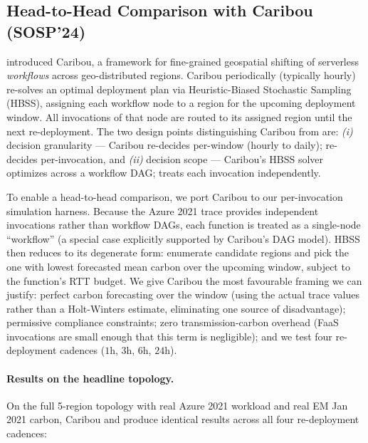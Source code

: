 \subsection{Head-to-Head Comparison with Caribou (SOSP'24)}
\label{sec:evaluation:caribou}

\citet{gsteiger2024caribou} introduced Caribou, a framework for
fine-grained geospatial shifting of serverless \emph{workflows}
across geo-distributed regions. Caribou periodically (typically
hourly) re-solves an optimal deployment plan via Heuristic-Biased
Stochastic Sampling (HBSS), assigning each workflow node to a
region for the upcoming deployment window. All invocations of that
node are routed to its assigned region until the next re-deployment.
The two design points distinguishing Caribou from \GreenFaaS{} are:
\emph{(i)} decision granularity --- Caribou re-decides per-window
(hourly to daily); \GreenFaaS{} re-decides per-invocation, and
\emph{(ii)} decision scope --- Caribou's HBSS solver optimizes across
a workflow DAG; \GreenFaaS{} treats each invocation independently.

To enable a head-to-head comparison, we port Caribou to our
per-invocation simulation harness. Because the Azure 2021 trace
provides independent invocations rather than workflow DAGs, each
function is treated as a single-node ``workflow'' (a special case
explicitly supported by Caribou's DAG model). HBSS then reduces to
its degenerate form: enumerate candidate regions and pick the one
with lowest forecasted mean carbon over the upcoming window,
subject to the function's RTT budget. We give Caribou the most
favourable framing we can justify: perfect carbon forecasting over
the window (using the actual trace values rather than a Holt-Winters
estimate, eliminating one source of disadvantage); permissive
compliance constraints; zero transmission-carbon overhead (FaaS
invocations are small enough that this term is negligible); and we
test four re-deployment cadences ($1$h, $3$h, $6$h, $24$h).

\paragraph{Results on the headline topology.}
On the full 5-region topology with real Azure 2021 workload and real
EM Jan 2021 carbon, Caribou and \GreenFaaS{} produce identical
results across all four re-deployment cadences:

